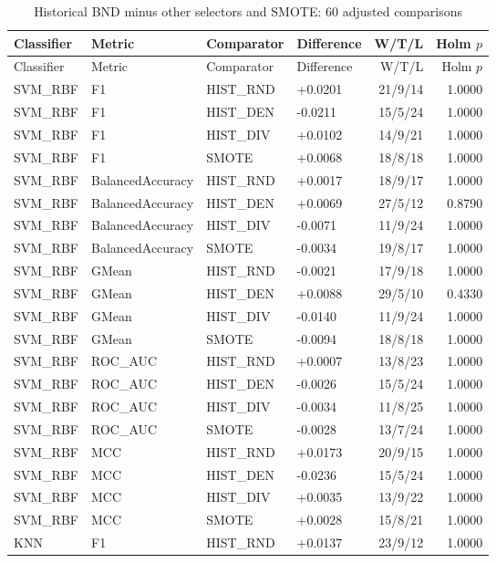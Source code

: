 \documentclass[10pt,a4paper]{article}
\begin{document}
\begingroup\small\setlength{\tabcolsep}{4pt}
\begin{longtable}{llllrr}
\caption{Historical BND minus other selectors and SMOTE: 60 adjusted comparisons}\label{tab:s4}\\
\toprule
Classifier & Metric & Comparator & Difference & W/T/L & Holm $p$ \\
\midrule
\endfirsthead
\toprule
Classifier & Metric & Comparator & Difference & W/T/L & Holm $p$ \\
\midrule
\endhead
\bottomrule
\endlastfoot
SVM\_RBF & F1 & HIST\_RND & +0.0201 & 21/9/14 & 1.0000 \\
SVM\_RBF & F1 & HIST\_DEN & -0.0211 & 15/5/24 & 1.0000 \\
SVM\_RBF & F1 & HIST\_DIV & +0.0102 & 14/9/21 & 1.0000 \\
SVM\_RBF & F1 & SMOTE & +0.0068 & 18/8/18 & 1.0000 \\
SVM\_RBF & BalancedAccuracy & HIST\_RND & +0.0017 & 18/9/17 & 1.0000 \\
SVM\_RBF & BalancedAccuracy & HIST\_DEN & +0.0069 & 27/5/12 & 0.8790 \\
SVM\_RBF & BalancedAccuracy & HIST\_DIV & -0.0071 & 11/9/24 & 1.0000 \\
SVM\_RBF & BalancedAccuracy & SMOTE & -0.0034 & 19/8/17 & 1.0000 \\
SVM\_RBF & GMean & HIST\_RND & -0.0021 & 17/9/18 & 1.0000 \\
SVM\_RBF & GMean & HIST\_DEN & +0.0088 & 29/5/10 & 0.4330 \\
SVM\_RBF & GMean & HIST\_DIV & -0.0140 & 11/9/24 & 1.0000 \\
SVM\_RBF & GMean & SMOTE & -0.0094 & 18/8/18 & 1.0000 \\
SVM\_RBF & ROC\_AUC & HIST\_RND & +0.0007 & 13/8/23 & 1.0000 \\
SVM\_RBF & ROC\_AUC & HIST\_DEN & -0.0026 & 15/5/24 & 1.0000 \\
SVM\_RBF & ROC\_AUC & HIST\_DIV & -0.0034 & 11/8/25 & 1.0000 \\
SVM\_RBF & ROC\_AUC & SMOTE & -0.0028 & 13/7/24 & 1.0000 \\
SVM\_RBF & MCC & HIST\_RND & +0.0173 & 20/9/15 & 1.0000 \\
SVM\_RBF & MCC & HIST\_DEN & -0.0236 & 15/5/24 & 1.0000 \\
SVM\_RBF & MCC & HIST\_DIV & +0.0035 & 13/9/22 & 1.0000 \\
SVM\_RBF & MCC & SMOTE & +0.0028 & 15/8/21 & 1.0000 \\
KNN & F1 & HIST\_RND & +0.0137 & 23/9/12 & 1.0000 \\

\end{longtable}
\end{document}
